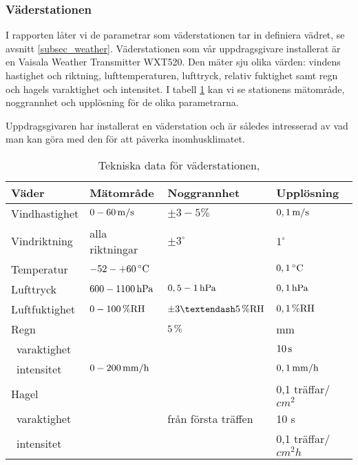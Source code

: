 \subsubsection{Väderstationen}
\label{subsubsec_weatertransmitter}
I rapporten låter vi de parametrar som väderstationen tar in definiera vädret, se avsnitt \ref{subsec_weather}. Väderstationen som vår uppdragsgivare installerat är en Vaisala Weather Transmitter WXT520. Den mäter sju olika värden: vindens hastighet och riktning, lufttemperaturen, lufttryck, relativ fuktighet samt regn och hagels varaktighet och intensitet. I tabell \ref{tbl:weathertransmitter} kan vi se stationens mätområde, noggrannhet och upplösning för de olika parametrarna.

Uppdragsgivaren har installerat en väderstation och är således intresserad av vad man kan göra med den för att påverka inomhusklimatet.

\begin{table}[htdp]
\caption{Tekniska data för väderstationen, \cite{datasheet_weathertransmitter}}
\begin{center}
\begin{tabular}{|l | l l l|}
\hline
\textbf{Väder} & \textbf{Mätområde} %
 & \textbf{Noggrannhet} %
 & \textbf{Upplösning} \\ %
\hline
\rule{0pt}{3ex}Vindhastighet & $\unit[0-60]{m/s}$ & $\pm 3-5\%$ & $\unit[0,1]{m/s}$ \\ 
\rule{0pt}{3ex}Vindriktning & alla riktningar & $\pm 3^{\circ}$ & $1^{\circ}$ \\
\rule{0pt}{3ex}Temperatur & $\unit[-52-+60]{^{\circ}C}$ & & $\unit[0,1]{^{\circ}C}$ \\
\rule{0pt}{3ex}Lufttryck & $\unit[600-1100]{hPa}$ & $\unit[0,5-1]{hPa}$ & $\unit[0,1]{hPa}$ \\
\rule{0pt}{3ex}Luftfuktighet & $\unit[0-100]{\%RH}$ & $\unit[\pm3–5]{\%RH}$ & $\unit[0,1]{\%RH}$ \\
\rule{0pt}{3ex}Regn &  & $\unit[5]{\%}$ & \unit[0,01]{mm} \\
~varaktighet & & & $\unit[10]{s}$\\
~intensitet & $\unit[0-200]{mm/h}$ & & $\unit[0,1]{mm/h}$ \\
\rule{0pt}{3ex}Hagel &  &  & 0,1 träffar/$\unit{cm^2}$ \\
~varaktighet & & från första träffen & 10 s\\
~intensitet & & & 0,1 träffar/$\unit{cm^2h}$\\
\hline
\end{tabular}
\end{center}
\label{tbl:weathertransmitter}
\end{table}
